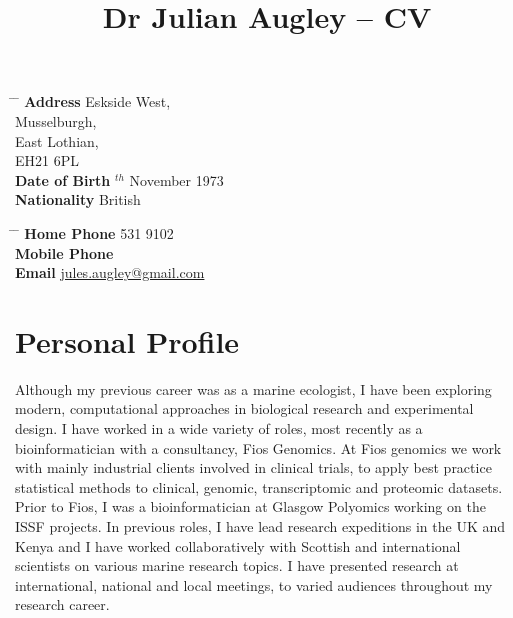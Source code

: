 \documentclass[10pt]{article} %
\begin{document}

\title{Dr Julian Augley -- CV} %


\parbox{0.5\textwidth}{ %
\begin{tabbing} %
\hspace{3cm} \= \hspace{4cm} \= \kill %
{\bf Address}  Eskside West,\\ %
\> Musselburgh, \\ %
\> East Lothian, \\ %
\> EH21 6PL \\ %
{\bf Date of Birth} $^{th}$ November 1973 \\ %
{\bf Nationality} \> British %
\end{tabbing}}
\hfill %
\parbox{0.5\textwidth}{ %
\begin{tabbing} %
\hspace{3cm} \= \hspace{4cm} \= \kill %
{\bf Home Phone}  531 9102 \\ %
{\bf Mobile Phone}  \\ %
{\bf Email} \> \href{mailto:jules.augley@gmail.com}{jules.augley@gmail.com} \\ %
\end{tabbing}}


\section{Personal Profile}

Although my previous career was as a marine ecologist, I have been exploring
modern, computational approaches in biological research and experimental design.
I have worked in a wide variety of roles, most recently as a bioinformatician
with a consultancy, Fios Genomics. At Fios genomics we work with mainly
industrial clients involved in clinical trials, to apply best practice
statistical methods to clinical, genomic, transcriptomic and proteomic datasets.
Prior to Fios, I was a bioinformatician at Glasgow Polyomics working on the ISSF
projects. In previous roles, I have lead research expeditions in the UK and
Kenya and I have worked collaboratively with Scottish and international
scientists on various marine research topics. I have presented research at
international, national and local meetings, to varied audiences throughout my
research career.
\end{document}
